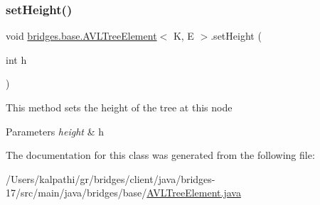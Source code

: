 \subsubsection{\texorpdfstring{set\+Height()}{setHeight()}}
{\footnotesize\ttfamily void \mbox{\hyperlink{classbridges_1_1base_1_1_a_v_l_tree_element}{bridges.\+base.\+A\+V\+L\+Tree\+Element}}$<$ K, E $>$.set\+Height (\begin{DoxyParamCaption}\item[{int}]{h }\end{DoxyParamCaption})}

This method sets the height of the tree at this node


\begin{DoxyParams}{Parameters}
{\em height} & h \\
\hline
\end{DoxyParams}


The documentation for this class was generated from the following file\+:\begin{DoxyCompactItemize}
\item 
/\+Users/kalpathi/gr/bridges/client/java/bridges-\/17/src/main/java/bridges/base/\mbox{\hyperlink{_a_v_l_tree_element_8java}{A\+V\+L\+Tree\+Element.\+java}}\end{DoxyCompactItemize}
